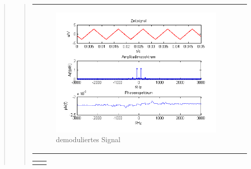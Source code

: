 \begin{quote}
\begin{quote}
\begin{center}
\begin{tabular}{ll}
            \begin{minipage}{0.67\textwidth}
                \begin{figure}[H]
                    \includegraphics[scale=0.7]{Bilder/Demo_Dre_2k_100Hz_mo_mitTiefpass}
                    \caption{demoduliertes Signal}
                    \label{fig:DemodreieckmT2}
                \end{figure}
        
            \end{minipage}
        
        \end{tabular}
        \end{center}
        
        \begin{center}
        \begin{tabular}{ll}
        
        \hspace{-5cm}
            \begin{minipage}{0.67\textwidth}
                

\end{minipage}
\end{tabular}
\end{center}
\end{quote}
\end{quote}
